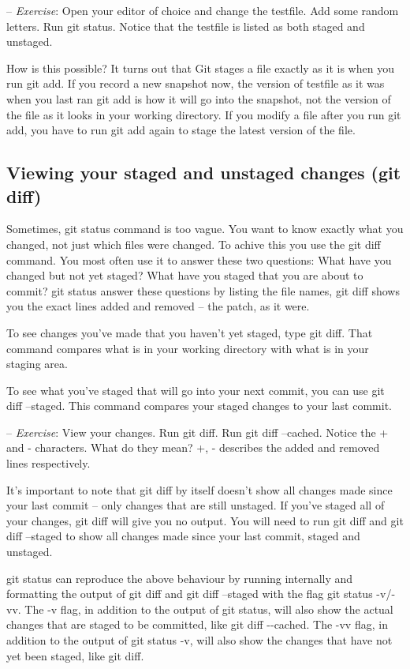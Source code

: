 \documentclass[12pt,a4]{article}
\newcommand{\ilcode}[1]{\textcolor[RGB]{160, 110, 220}{#1}}
\begin{document}
{\sf -- \emph{Exercise}:} Open your editor of choice and change the testfile.
Add some random letters. Run \ilcode{git status}. Notice that the testfile is
listed as both staged and unstaged.

How is this possible? It turns out that Git stages a file exactly as it is when
you run \ilcode{git add}. If you record a new snapshot now, the version of
testfile as it was when you last ran \ilcode{git add} is how it will go into the
snapshot, not the version of the file as it looks in your working directory. If
you modify a file after you run \ilcode{git add}, you have to run \ilcode{git
add} again to stage the latest version of the file.

\subsection{Viewing your staged and unstaged changes (git diff)}
Sometimes, \ilcode{git status} command is too vague. You want to know exactly
what you changed, not just which files were changed. To achive this you use the
\ilcode{git diff} command. You most often use it to answer these two questions:
What have you changed but not yet staged? What have you staged that you are
about to commit? \ilcode{git status} answer these questions by listing the file
names, \ilcode{git diff} shows you the exact lines added and removed -- the
patch, as it were.

To see changes you've made that you haven't yet staged, type \ilcode{git diff}.
That command compares what is in your working directory with what is in your
staging area.

To see what you’ve staged that will go into your next commit, you can use
\ilcode{git diff --staged}. This command compares your staged changes to your
last commit.

{\sf -- \emph{Exercise}:} View your changes. Run \ilcode{git diff}. Run
\ilcode{git diff --cached}. Notice the + and - characters. What do they mean?
+, - describes the added and removed lines respectively.

It’s important to note that \ilcode{git diff} by itself doesn’t show all changes
made since your last commit -- only changes that are still unstaged. If you’ve
staged all of your changes, \ilcode{git diff} will give you no output. You will
need to run \ilcode{git diff} and \ilcode{git diff --staged} to show all changes
made since your last commit, staged and unstaged.

\ilcode{git status} can reproduce the above behaviour by running internally and
formatting the output of \ilcode{git diff} and \ilcode{git diff --staged} with
the flag \ilcode{git status -v}/\ilcode{-vv}. The \ilcode{-v} flag, in addition
to the output of \ilcode{git status}, will also show the actual changes that are
staged to be committed, like \ilcode{git diff -{}-cached}. The \ilcode{-vv}
flag, in addition to the output of \ilcode{git status -v}, will also show the
changes that have not yet been staged, like \ilcode{git diff}.
\end{document}
